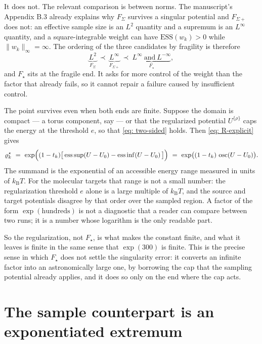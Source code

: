 \documentclass[11pt]{article}
\theoremstyle{plain}
\newcommand{\ESS}{\mathrm{ESS}}
\newcommand{\osc}{\operatorname{osc}}
\newcommand{\esssup}{\operatorname*{ess\,sup}}
\newcommand{\essinf}{\operatorname*{ess\,inf}}
\begin{document}
It does not. The relevant comparison is between norms. The manuscript's
Appendix B.3 already explains why $F_\Sigma$ survives a singular potential and
$F_{\Sigma+}$ does not: an effective sample size is an $L^2$ quantity and a
supremum is an $L^\infty$ quantity, and a square-integrable weight can have
$\ESS(w_k)>0$ while $\lVert w_k\rVert_\infty=\infty$. The ordering of the three
candidates by fragility is therefore
\begin{equation*}
    \underbrace{L^2}_{\textstyle F_\Sigma}
    \ \prec\
    \underbrace{L^\infty}_{\textstyle F_{\Sigma+}}
    \ \prec\
    \underbrace{L^\infty\ \text{and}\ L^{-\infty}}_{\textstyle F_\star},
\end{equation*}
and $F_\star$ sits at the fragile end. It asks for more control of the weight
than the factor that already fails, so it cannot repair a failure caused by
insufficient control.

The point survives even when both ends are finite. Suppose the domain is
compact --- a torus component, say --- or that the regularized potential
$U^{\{\rho\}}$ caps the energy at the threshold $e$, so that
\eqref{eq: two-sided} holds. Then \eqref{eq: R-explicit} gives
\begin{equation}
    \varrho^\star_k
    \ =\ \exp\Bigl((1-t_k)\bigl[\,\esssup(U-U_0)-\essinf(U-U_0)\,\bigr]\Bigr)
    \ =\ \exp\bigl((1-t_k)\,\osc(U-U_0)\bigr).
    \label{eq: rho-star-energy}
\end{equation}
The summand is the exponential of an accessible energy range measured in units
of $k_{\mathrm B}T$. For the molecular targets that range is not a small
number: the regularization threshold $e$ alone is a large multiple of
$k_{\mathrm B}T$, and the source and target potentials disagree by that order
over the sampled region. A factor of the form $\exp(\text{hundreds})$ is not a
diagnostic that a reader can compare between two runs; it is a number whose
logarithm is the only readable part.

So the regularization, not $F_\star$, is what makes the constant finite, and
what it leaves is finite in the same sense that $\exp(300)$ is finite. This is
the precise sense in which $F_\star$ does not settle the singularity error: it
converts an infinite factor into an astronomically large one, by borrowing the
cap that the sampling potential already applies, and it does so only on the end
where the cap acts.

\section{The sample counterpart is an exponentiated extremum}
\end{document}
